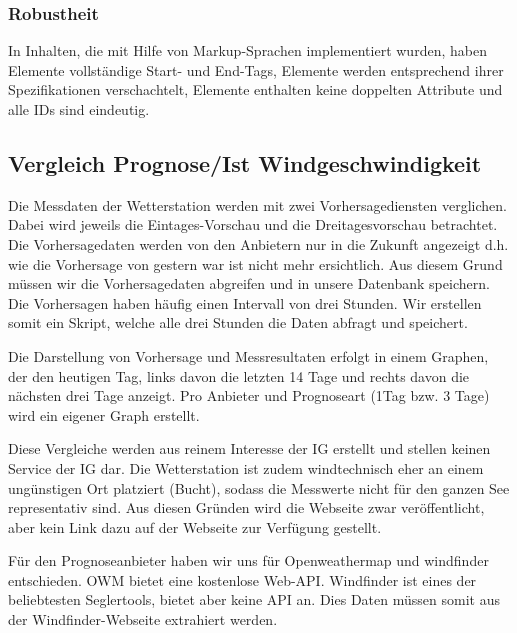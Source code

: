 \subsubsection*{Robustheit}
 In Inhalten, die mit Hilfe von Markup-Sprachen implementiert wurden, haben Elemente vollständige Start- und End-Tags, Elemente werden entsprechend ihrer Spezifikationen verschachtelt, Elemente enthalten keine doppelten Attribute und alle IDs sind eindeutig. 
 
 
 



\subsection{Vergleich Prognose/Ist Windgeschwindigkeit}

Die Messdaten der Wetterstation werden mit zwei Vorhersagediensten verglichen. Dabei wird jeweils die Eintages-Vorschau und die Dreitagesvorschau betrachtet.
Die Vorhersagedaten werden von den Anbietern nur in die Zukunft angezeigt d.h. wie die Vorhersage von gestern war ist nicht mehr ersichtlich. Aus diesem Grund müssen wir die Vorhersagedaten abgreifen und in unsere Datenbank speichern. Die Vorhersagen haben häufig einen Intervall von drei Stunden. Wir erstellen somit ein Skript, welche alle drei Stunden die Daten abfragt und speichert.

Die Darstellung von Vorhersage und Messresultaten erfolgt in einem Graphen, der den heutigen Tag, links davon die letzten 14 Tage und rechts davon die nächsten drei Tage anzeigt. Pro Anbieter und Prognoseart (1Tag bzw. 3 Tage) wird ein eigener Graph erstellt.

Diese Vergleiche werden aus reinem Interesse der IG erstellt und stellen keinen Service der IG dar. Die Wetterstation ist zudem windtechnisch eher an einem ungünstigen Ort platziert (Bucht), sodass die Messwerte nicht für den ganzen See representativ sind.
Aus diesen Gründen wird die Webseite zwar veröffentlicht, aber kein Link dazu auf der Webseite zur Verfügung gestellt.

Für den Prognoseanbieter haben wir uns für Openweathermap und windfinder entschieden. OWM bietet eine kostenlose Web-API. Windfinder ist eines der beliebtesten Seglertools, bietet aber keine API an. Dies Daten müssen somit aus der Windfinder-Webseite extrahiert werden.

